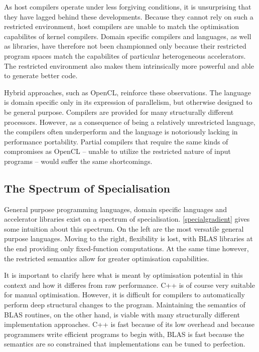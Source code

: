     As host compilers operate under less forgiving conditions, it is
    unsurprising that they have lagged behind these developments.
    Because they cannot rely on such a restricted environment, host compilers
    are unable to match the optimisation capabilites of kernel compilers.
    Domain specific compilers and languages, as well as libraries, have
    therefore not been championned only because their restricted program
    spaces match the capabilites of particular heterogeneous accelerators.
    The restricted environment also makes them intrinsically more powerful and
    able to generate better code.

    Hybrid approaches, such as OpenCL, reinforce these observations.
    The language is domain specific only in its expression of parallelism, but
    otherwise designed to be general purpose.
    Compilers are provided for many structurally different processors.
    However, as a consequence of being a relatively unrestricted language, the
    compilers often underperform and the language is notoriously lacking in
    performance portability.
    Partial compilers that require the same kinds of compromises as OpenCL --
    unable to utilize the restricted nature of input programs -- would suffer
    the same shortcomings.

\subsection{The Spectrum of Specialisation}

    General purpose programming languages, domain specific languages and
    accelerator libraries exist on a spectrum of specialisation.
    \autoref{specialgradient} gives some intuition about this spectrum.
    On the left are the most versatile general purpose languages.
    Moving to the right, flexibility is lost, with BLAS libraries at the end
    providing only fixed-function computations.
    At the same time however, the restricted semantics allow for greater 
    optimisation capabilities.

    It is important to clarify here what is meant by optimisation potential in
    this context and how it differes from raw performance.
    C++ is of course very suitable for manual optimisation.
    However, it is difficult for compilers to automatically perform deep
    structural changes to the program.
    Maintaining the semantics of BLAS routines, on the other hand, is viable
    with many structurally different implementation approaches.
    C++ is fast because of its low overhead and because programmers write
    efficient programs to begin with, BLAS is fast because the semantics are so
    constrained that implementations can be tuned to perfection.

